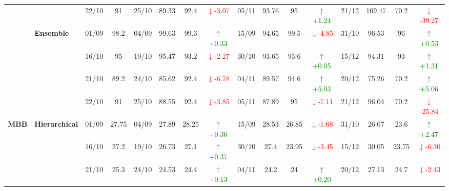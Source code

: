 {\begin{longtable}{llcc|cccc|cccc|cccc}
&
& 22/10 & 91 & 25/10 & 89.33 & 92.4 & \textcolor{red}{\(\downarrow\)-3.07} & 05/11 & 93.76 & 95 & \textcolor{green}{\(\uparrow\)+1.24} & 21/12 & 109.47 & 70.2 & \textcolor{red}{\(\downarrow\)-39.27} \\
\cmidrule(lr){2-16}


& \textbf{Ensemble}
& 01/09 & 98.2 & 04/09 & 99.63 & 99.3 & \textcolor{green}{\(\uparrow\)+0.33} & 15/09 & 94.65 & 99.5 & \textcolor{red}{\(\downarrow\)-4.85} & 31/10 & 96.53 & 96 & \textcolor{green}{\(\uparrow\)+0.53} \\

&
& 16/10 & 95 & 19/10 & 95.47 & 93.2 & \textcolor{red}{\(\downarrow\)-2.27} & 30/10 & 93.65 & 93.6 & \textcolor{green}{\(\uparrow\)+0.05} & 15/12 & 94.31 & 93 & \textcolor{green}{\(\uparrow\)+1.31} \\

&
& 21/10 & 89.2 & 24/10 & 85.62 & 92.4 & \textcolor{red}{\(\downarrow\)-6.78} & 04/11 & 89.57 & 94.6 & \textcolor{green}{\(\uparrow\)+5.03} & 20/12 & 75.26 & 70.2 & \textcolor{green}{\(\uparrow\)+5.06} \\

&
& 22/10 & 91 & 25/10 & 88.55 & 92.4 & \textcolor{red}{\(\downarrow\)-3.85} & 05/11 & 87.89 & 95 & \textcolor{red}{\(\downarrow\)-7.11} & 21/12 & 96.04 & 70.2 & \textcolor{red}{\(\downarrow\)-25.84} \\
\midrule



\multirow{12}{*}{\textbf{MBB}} 
& \textbf{Hierarchical}
& 01/09 & 27.75 & 04/09 & 27.89 & 28.25 & \textcolor{green}{\(\uparrow\)+0.36} & 15/09 & 28.53 & 26.85 & \textcolor{red}{\(\downarrow\)-1.68} & 31/10 & 26.07 & 23.6 & \textcolor{green}{\(\uparrow\)+2.47} \\

&
& 16/10 & 27.2 & 19/10 & 26.73 & 27.1 & \textcolor{green}{\(\uparrow\)+0.37} & 30/10 & 27.4 & 23.95 & \textcolor{red}{\(\downarrow\)-3.45} & 15/12 & 30.05 & 23.75 & \textcolor{red}{\(\downarrow\)-6.30} \\

&
& 21/10 & 25.3 & 24/10 & 24.53 & 24.4 & \textcolor{green}{\(\uparrow\)+0.13} & 04/11 & 24.2 & 24 & \textcolor{green}{\(\uparrow\)+0.20} & 20/12 & 27.13 & 24.7 & \textcolor{red}{\(\downarrow\)-2.43} \\


\end{longtable}}

